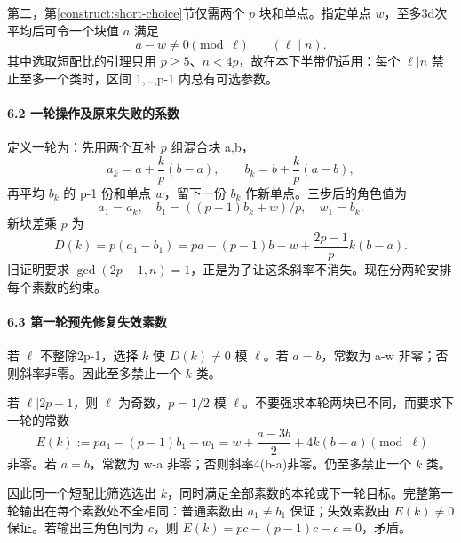 \documentclass[11pt,a4paper]{article}
\theoremstyle{definition}
\numberwithin{equation}{section}
\begin{document}
{第二，}第\ref{construct:short-choice}节{仅需两个} {\ensuremath{p}} {块和单点。指定单点} {\ensuremath{w}，至多3d次平均后可令一个块值} {\ensuremath{a}} {满足} \[
a-w\ne0\pmod\ell\qquad(\ell\mid n).
\tag{C9.14}
\] {其中选取短配比的引理只用} {\ensuremath{p\ge 5}、\ensuremath{n<4p}，故在本下半带仍适用：每个} {\ensuremath{\ell |n}} {禁止至多一个类时，区间} {1,\ldots,p-1} {内总有可选参数。}

\paragraph*{\texorpdfstring{{6.2} {一轮操作及原来失败的系数}}{6.2 一轮操作及原来失败的系数}}\label{C9-h67}

{定义一轮为：先用两个互补} {\ensuremath{p}} {组混合块} {a,b，} \[
a_k=a+\frac{k}{p}(b-a),\qquad
b_k=b+\frac{k}{p}(a-b),
\] {再平均} {\ensuremath{b_{k}}} {的} {p-1} {份和单点} {\ensuremath{w}，留下一份} {\ensuremath{b_{k}}} {作新单点。三步后的角色值为} \[
a_1=a_k,\quad b_1=((p-1)b_k+w)/p,\quad w_1=b_k.
\] {新块差乘} {\ensuremath{p}} {为} \[
D(k)=p(a_1-b_1)
=pa-(p-1)b-w+\frac{2p-1}{p}k(b-a).
\tag{C9.15}
\] {旧证明要求} {\ensuremath{\operatorname{gcd}(2p-1,n)=1}，正是为了让这条斜率不消失。现在分两轮安排每个素数的约束。}

\paragraph*{\texorpdfstring{{6.3} {第一轮预先修复失效素数}}{6.3 第一轮预先修复失效素数}}\label{C9-h68}

{若} {\ensuremath{\ell }} {不整除2p-1，选择} {\ensuremath{k}} {使} {\ensuremath{D(k)\ne 0}} {模} {\ensuremath{\ell }。若} {\ensuremath{a=b}，常数为} {a-w} {非零；否则斜率非零。因此至多禁止一个} {\ensuremath{k}} {类。}

{若} {\ensuremath{\ell |2p-1}，则} {\ensuremath{\ell }} {为奇数，\ensuremath{p=1/2}} {模} {\ensuremath{\ell }。不要强求本轮两块已不同，而要求下一轮的常数} \[
E(k):=p a_1-(p-1)b_1-w_1
=w+\frac{a-3b}{2}+4k(b-a)\pmod\ell
\tag{C9.16}
\] {非零。若} {\ensuremath{a=b}，常数为} {w-a} {非零；否则斜率4(b-a)非零。仍至多禁止一个} {\ensuremath{k}} {类。}

{因此同一个短配比筛选选出} {\ensuremath{k}，同时满足全部素数的本轮或下一轮目标。完整第一轮输出在每个素数处不全相同：普通素数由} {\ensuremath{a_{1}\ne b_{1}}} {保证；失效素数由} {\ensuremath{E(k)\ne 0}} {保证。若输出三角色同为} {\ensuremath{c}，则} {\ensuremath{E(k)=pc-(p-1)c-c=0}，矛盾。}
\end{document}

